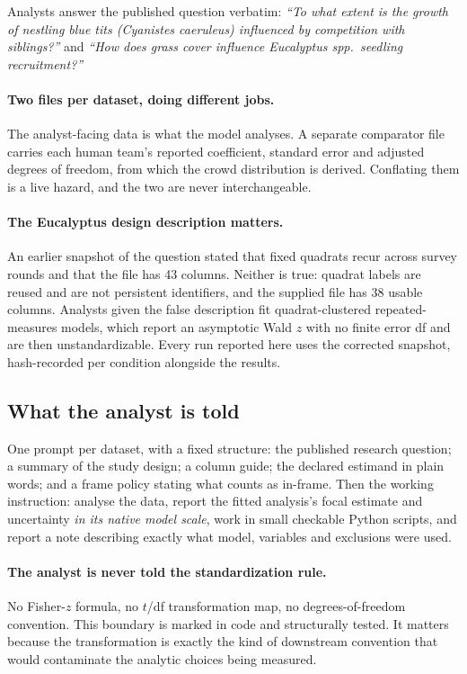 \documentclass{article}
\begin{document}
Analysts answer the published question verbatim: \emph{``To what extent is the
growth of nestling blue tits (Cyanistes caeruleus) influenced by competition
with siblings?''} and \emph{``How does grass cover influence Eucalyptus spp.\
seedling recruitment?''}

\paragraph{Two files per dataset, doing different jobs.}
The analyst-facing data is what the model analyses. A separate comparator file
carries each human team's reported coefficient, standard error and adjusted
degrees of freedom, from which the crowd distribution is derived. Conflating
them is a live hazard, and the two are never interchangeable.

\paragraph{The Eucalyptus design description matters.}
An earlier snapshot of the question stated that fixed quadrats recur across
survey rounds and that the file has 43 columns. Neither is true: quadrat labels
are reused and are not persistent identifiers, and the supplied file has 38
usable columns. Analysts given the false description fit quadrat-clustered
repeated-measures models, which report an asymptotic Wald $z$ with no finite
error df and are then unstandardizable. Every run reported here uses the
corrected snapshot, hash-recorded per condition alongside the results.

\subsection{What the analyst is told}
\label{sec:setup-prompt}

One prompt per dataset, with a fixed structure: the published research question;
a summary of the study design; a column guide; the declared estimand in plain
words; and a frame policy stating what counts as in-frame. Then the working
instruction: analyse the data, report the fitted analysis's focal estimate and
uncertainty \emph{in its native model scale}, work in small checkable Python
scripts, and report a note describing exactly what model, variables and
exclusions were used.

\paragraph{The analyst is never told the standardization rule.}
No Fisher-$z$ formula, no $t$/df transformation map, no degrees-of-freedom
convention. This boundary is marked in code and structurally tested. It matters
because the transformation is exactly the kind of downstream convention that
would contaminate the analytic choices being measured.
\end{document}
